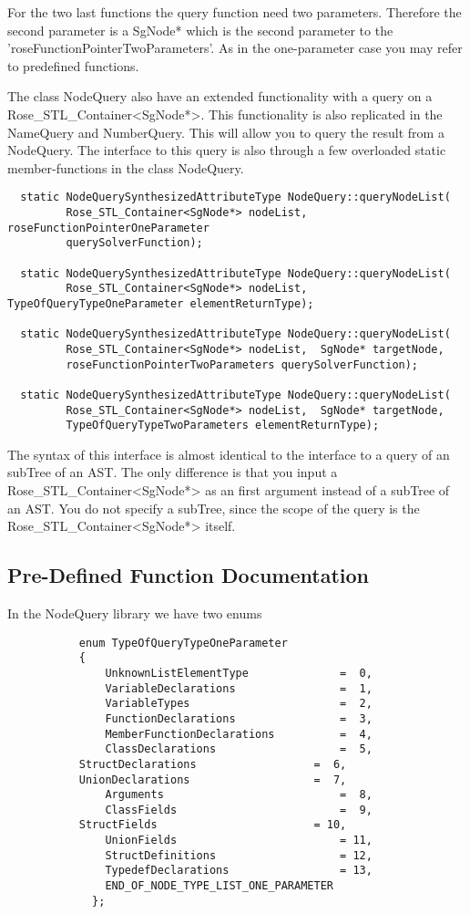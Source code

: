 {For the two last functions the query function need two
parameters. Therefore the second parameter is a SgNode* which is the
second parameter to the 'roseFunctionPointerTwoParameters'. As in the
one-parameter case you may refer to predefined functions.

The class NodeQuery also have an extended functionality with a query
on a Rose\_STL\_Container<SgNode*>. This functionality is also replicated in the
NameQuery and NumberQuery. This will allow you to query the result
from a NodeQuery. The interface to this query is also through a few
overloaded static member-functions in the class NodeQuery.
\begin{verbatim}
  static NodeQuerySynthesizedAttributeType NodeQuery::queryNodeList(
         Rose_STL_Container<SgNode*> nodeList, roseFunctionPointerOneParameter
         querySolverFunction);

  static NodeQuerySynthesizedAttributeType NodeQuery::queryNodeList(
         Rose_STL_Container<SgNode*> nodeList, TypeOfQueryTypeOneParameter elementReturnType);
	  
  static NodeQuerySynthesizedAttributeType NodeQuery::queryNodeList(
         Rose_STL_Container<SgNode*> nodeList,  SgNode* targetNode, 
         roseFunctionPointerTwoParameters querySolverFunction);  

  static NodeQuerySynthesizedAttributeType NodeQuery::queryNodeList(
         Rose_STL_Container<SgNode*> nodeList,  SgNode* targetNode, 
         TypeOfQueryTypeTwoParameters elementReturnType);
\end{verbatim}
The syntax of this interface is almost identical to the interface to a query
of an subTree of an AST.  The only difference is that you input a
Rose\_STL\_Container<SgNode*> as an first argument instead of a subTree of an AST. You
do not specify a subTree, since the scope of the query is the Rose\_STL\_Container<SgNode*> itself.  

\subsection{Pre-Defined Function Documentation}
\label{FunctionDocumentation}

In the NodeQuery library we have two enums
\begin{verbatim}
           enum TypeOfQueryTypeOneParameter		
	       {
               UnknownListElementType              =  0,
               VariableDeclarations                =  1,
               VariableTypes                       =  2,
               FunctionDeclarations                =  3,
               MemberFunctionDeclarations          =  4,
               ClassDeclarations                   =  5,
	       StructDeclarations                  =  6,
	       UnionDeclarations                   =  7,
               Arguments                           =  8,
               ClassFields                         =  9,
	       StructFields                        = 10,
               UnionFields                         = 11,
               StructDefinitions                   = 12,
               TypedefDeclarations                 = 13,
               END_OF_NODE_TYPE_LIST_ONE_PARAMETER
             };
	 

\end{verbatim}}
